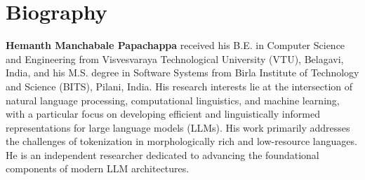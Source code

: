 \documentclass[conference]{IEEEtran}
\begin{document}
\section*{Biography}
\noindent\textbf{Hemanth Manchabale Papachappa} received his B.E. in Computer Science and Engineering from Visvesvaraya Technological University (VTU), Belagavi, India, and his M.S. degree in Software Systems from Birla Institute of Technology and Science (BITS), Pilani, India. His research interests lie at the intersection of natural language processing, computational linguistics, and machine learning, with a particular focus on developing efficient and linguistically informed representations for large language models (LLMs). His work primarily addresses the challenges of tokenization in morphologically rich and low-resource languages. He is an independent researcher dedicated to advancing the foundational components of modern LLM architectures.
\end{document}
